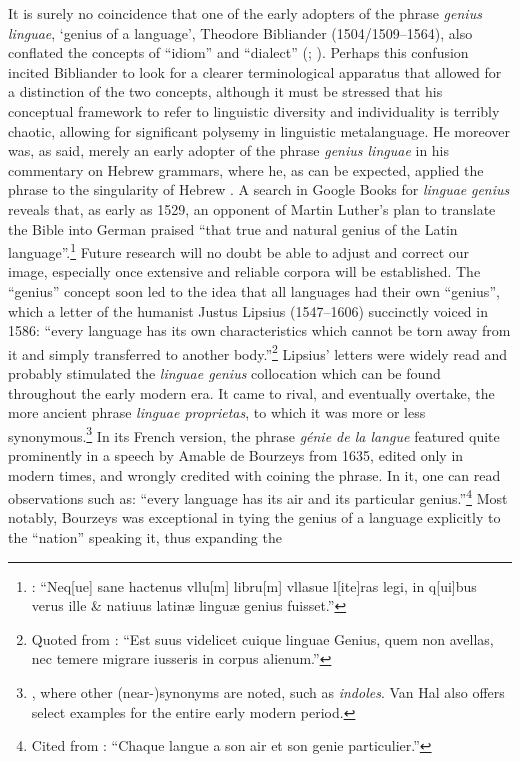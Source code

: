 It is surely no coincidence that one of the early adopters of the phrase \textit{genius linguae}, ‘genius of a language’, Theodore Bibliander (1504/1509--1564), also conflated the concepts of “idiom” and “dialect” (\cite[84--85]{van_hal_genie_2013}; \cite[77--78]{van_rooy_language_2020}). Perhaps this confusion incited Bibliander to look for a clearer terminological apparatus that allowed for a distinction of the two concepts, although it must be stressed that his conceptual framework to refer to linguistic diversity and individuality is terribly chaotic, allowing for significant polysemy in linguistic metalanguage. He moreover was, as said, merely an early adopter of the phrase \textit{genius linguae} in his \citeyear{bibliander_optimo_1542} commentary on Hebrew grammars, where he, as can be expected, applied the phrase to the singularity of Hebrew \citep[15]{bibliander_optimo_1542}. A search in Google Books for \textit{linguae} \textit{genius} reveals that, as early as 1529, an opponent of Martin Luther’s plan to translate the Bible into German praised “that true and natural genius of the Latin language”.\footnote{\citet[Y1v]{of_saxony_epistolae_1529}: “Neq[ue] sane hactenus vllu[m] libru[m] vllasue l[ite]ras legi, in q[ui]bus verus ille \& natiuus latinæ linguæ genius fuisset.”} Future research will no doubt be able to adjust and correct our image, especially once extensive and reliable corpora will be established. The “genius” concept soon led to the idea that all languages had their own “genius”, which a letter of the humanist Justus Lipsius (1547--1606) succinctly voiced in 1586: “every language has its own characteristics which cannot be torn away from it and simply transferred to another body.”\footnote{Quoted from \citet[88]{van_hal_genie_2013}: “Est suus videlicet cuique linguae Genius, quem non avellas, nec temere migrare iusseris in corpus alienum.”} Lipsius’ letters were widely read and probably stimulated the \textit{linguae genius} collocation which can be found throughout the early modern era. It came to rival, and eventually overtake, the more ancient phrase \textit{linguae proprietas}, to which it was more or less synonymous.\footnote{\citet[88--90]{van_hal_genie_2013}, where other (near-)synonyms are noted, such as \textit{indoles}. Van Hal also offers select examples for the entire early modern period.} In its French version, the phrase \textit{génie de la langue} featured quite prominently in a speech by Amable de Bourzeys from 1635, edited only in modern times, and wrongly credited with coining the phrase. In it, one can read observations such as: “every language has its air and its particular genius.”\footnote{Cited from \citet[84]{van_hal_genie_2013}: “Chaque langue a son air et son genie particulier.”} Most notably, Bourzeys was exceptional in tying the genius of a language explicitly to the “nation” speaking it, thus expanding the 